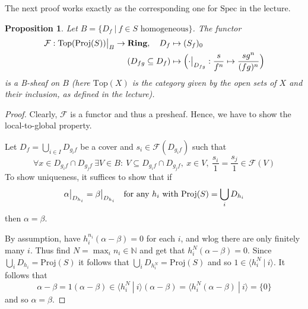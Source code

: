 \documentclass{scrartcl}
\newcommand{\N}{\mathbb{N}}
\newcommand{\Ring}{\mathrm{\textbf{Ring}}}
\newcommand{\Top}{\mathrm{Top}}
\newcommand{\Spec}{\mathrm{Spec}}
\newcommand{\Proj}{\mathrm{Proj}}
\newcommand\restr[2]{{
    \left.\kern-\nulldelimiterspace
    #1
    \vphantom{\big|}
    \right|_{#2}
}}
\newtheorem{prop}{Proposition}
\theoremstyle{definition}
\begin{document}
The next proof works exactly as the corresponding one for $\Spec$ in the lecture.
\begin{prop}
    Let $B = \{ D_f \ | \ \text{$f \in S$ homogeneous}\}$.
    The functor
    \begin{align*}
        \mathcal{F}: \restr{\Top(\Proj(S))}{B} \to \Ring, \quad D_f &\mapsto (S_f)_0 \\
        (D_{fg} \subseteq D_f) &\mapsto \Bigl( \restr{\cdot}{D_{fg}}: \frac s {f^n} \mapsto \frac {sg^n} {(fg)^n} \Bigr)
    \end{align*}
    is a B-sheaf on $B$ (here $\Top(X)$ is the category given by the open sets of $X$ and their inclusion, as defined in the lecture).
\end{prop}
\begin{proof}
    Clearly, $\mathcal{F}$ is a functor and thus a presheaf.
    Hence, we have to show the local-to-global property.

    Let $D_f = \bigcup_{i \in I} D_{g_if}$ be a cover and $s_i \in \mathcal{F}(D_{g_if})$ such that
    \begin{equation*}
        \forall x \in D_{g_if} \cap D_{g_jf} \ \exists V \in B: \ V \subseteq D_{g_if} \cap D_{g_jf}, \ x \in V, \ \frac {s_i} 1 = \frac {s_j} 1 \in \mathcal{F}(V)
    \end{equation*}
    To show uniqueness, it suffices to show that if
    \begin{equation*}
        \restr{\alpha}{D_{h_i}} = \restr{\beta}{D_{h_i}} \quad \text{for any $h_i$ with}\ \Proj(S) = \bigcup_i D_{h_i}
    \end{equation*}
    then $\alpha = \beta$.

    By assumption, have $h_i^{n_i}(\alpha - \beta) = 0$ for each $i$, and wlog there are only finitely many $i$.
    Thus find $N = \max_i n_i \in \N$ and get that $h_i^N(\alpha - \beta) = 0$.
    Since $\bigcup_i D_{h_i} = \Proj(S)$ it follows that $\bigcup_i D_{h_i^N} = \Proj(S)$ and so $1 \in \langle h_i^N \ | \ i \rangle$.
    It follows that
    \begin{equation*}
        \alpha - \beta = 1(\alpha - \beta) \in \langle h_i^N \ | \ i \rangle (\alpha - \beta) = \langle h_i^N (\alpha - \beta) \ | \ i \rangle = \{ 0 \}
    \end{equation*}
    and so $\alpha = \beta$.


\end{proof}
\end{document}
